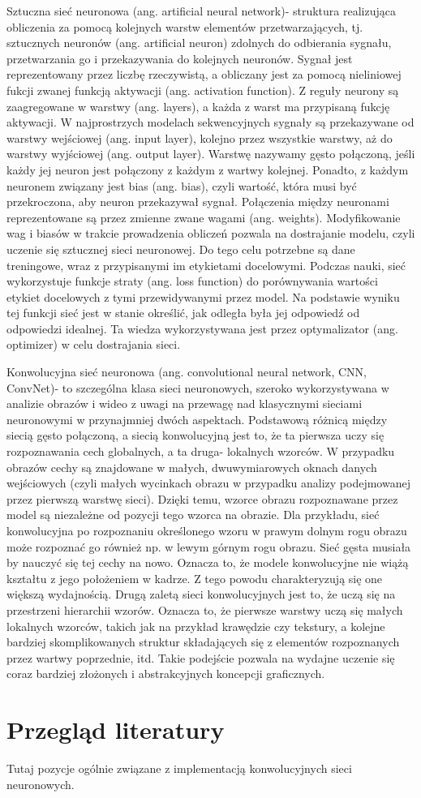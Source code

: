 Sztuczna sieć neuronowa (ang. artificial neural network)- struktura realizująca obliczenia za pomocą kolejnych warstw elementów przetwarzających, tj. sztucznych neuronów (ang. artificial neuron) zdolnych do odbierania sygnału, przetwarzania go i przekazywania do kolejnych neuronów. Sygnał jest reprezentowany przez liczbę rzeczywistą, a obliczany jest za pomocą nieliniowej fukcji zwanej funkcją aktywacji (ang. activation function). Z reguły neurony są zaagregowane w warstwy (ang. layers), a każda z warst ma przypisaną fukcję aktywacji. W najprostrzych modelach sekwencyjnych sygnały są przekazywane od warstwy wejściowej (ang. input layer), kolejno przez wszystkie warstwy, aż do warstwy wyjściowej (ang. output layer). Warstwę nazywamy gęsto połączoną, jeśli każdy jej neuron jest połączony z każdym z wartwy kolejnej. Ponadto, z każdym neuronem związany jest bias (ang. bias), czyli wartość, która musi być przekroczona, aby neuron przekazywał sygnał. Połączenia między neuronami reprezentowane są przez zmienne zwane wagami (ang. weights). Modyfikowanie wag i biasów w trakcie prowadzenia obliczeń pozwala na dostrajanie modelu, czyli uczenie się sztucznej sieci neuronowej. Do tego celu potrzebne są dane treningowe, wraz z przypisanymi im etykietami docelowymi. Podczas nauki, sieć wykorzystuje funkcje straty (ang. loss function) do porównywania wartości etykiet docelowych z tymi przewidywanymi przez model. Na podstawie wyniku tej funkcji sieć jest w stanie określić, jak odległa była jej odpowiedź od odpowiedzi idealnej. Ta wiedza wykorzystywana jest przez optymalizator (ang. optimizer) w celu dostrajania sieci.

Konwolucyjna sieć neuronowa (ang. convolutional neural network, CNN, ConvNet)- to szczególna klasa sieci neuronowych, szeroko wykorzystywana w analizie obrazów i wideo z uwagi na przewagę nad klasycznymi sieciami neuronowymi w przynajmniej dwóch aspektach. Podstawową różnicą między siecią gęsto połączoną, a siecią konwolucyjną jest to, że ta pierwsza uczy się rozpoznawania cech globalnych, a ta druga- lokalnych wzorców. W przypadku obrazów cechy są znajdowane w małych, dwuwymiarowych oknach danych wejściowych (czyli małych wycinkach obrazu w przypadku analizy podejmowanej przez pierwszą warstwę sieci). Dzięki temu, wzorce obrazu rozpoznawane przez model są niezależne od pozycji tego wzorca na obrazie. Dla przykładu, sieć konwolucyjna po rozpoznaniu określonego wzoru w prawym dolnym rogu obrazu może rozpoznać go również np. w lewym górnym rogu obrazu. Sieć gęsta musiała by nauczyć się tej cechy na nowo. Oznacza to, że modele konwolucyjne nie wiążą kształtu z jego położeniem w kadrze. Z tego powodu charakteryzują się one większą wydajnością. Drugą zaletą sieci konwolucyjnych jest to, że uczą się na przestrzeni hierarchii wzorów. Oznacza to, że pierwsze warstwy uczą się małych lokalnych wzorców, takich jak na przykład krawędzie czy tekstury, a kolejne bardziej skomplikowanych struktur składających się z elementów rozpoznanych przez wartwy poprzednie, itd. Takie podejście pozwala na wydajne uczenie się coraz bardziej złożonych i abstrakcyjnych koncepcji graficznych.


\section{Przegląd literatury}
Tutaj pozycje ogólnie związane z implementacją konwolucyjnych sieci neuronowych.
